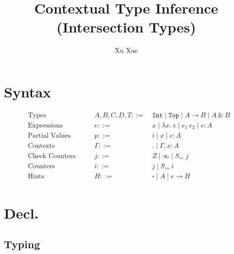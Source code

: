 \documentclass{article}
\title{Contextual Type Inference (Intersection Types)}
\author{Xu Xue}
\begin{document}
\maketitle

\section{Syntax}

\begin{align*}
&\text{Types} \quad\quad &A, B, C, D, T ::=&~ \mathtt{Int} \mid \mathtt{Top} \mid A \rightarrow B \mid A~\&~B\\
&\text{Expressions} \quad \quad &e::=&~ x \mid \lambda x . ~e \mid e_1~e_2 \mid e : A\\
&\text{Partial Values} \quad \quad &p::=&~ i \mid x \mid e : A\\
&\text{Contexts} \quad\quad &\Gamma::=&~ . \mid \Gamma, x : A\\
&\text{Check Counters} \quad\quad &j ::=&~ Z \mid \infty \mid S_{\Leftarrow}~j \\
&\text{Counters} \quad\quad &i ::= &~ j \mid S_{\Rightarrow}~i\\
&\text{Hints} \quad\quad &H ::=&~ \square \mid A \mid \boxed{e} \rightarrow H\\
\end{align*}

\section{Decl.}

\subsection{Typing}
\end{document}
